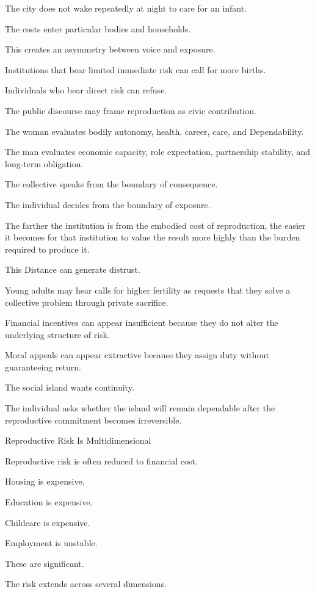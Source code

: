 The city does not wake repeatedly at night to care for an infant.

The costs enter particular bodies and households.

This creates an asymmetry between voice and exposure.

Institutions that bear limited immediate risk can call for more births.

Individuals who bear direct risk can refuse.

The public discourse may frame reproduction as civic contribution.

The woman evaluates bodily autonomy, health, career, care, and Dependability.

The man evaluates economic capacity, role expectation, partnership stability, and long-term obligation.

The collective speaks from the boundary of consequence.

The individual decides from the boundary of exposure.

The farther the institution is from the embodied cost of reproduction, the easier it becomes for that institution to value the result more highly than the burden required to produce it.

This Distance can generate distrust.

Young adults may hear calls for higher fertility as requests that they solve a collective problem through private sacrifice.

Financial incentives can appear insufficient because they do not alter the underlying structure of risk.

Moral appeals can appear extractive because they assign duty without guaranteeing return.

The social island wants continuity.

The individual asks whether the island will remain dependable after the reproductive commitment becomes irreversible.

Reproductive Risk Is Multidimensional

Reproductive risk is often reduced to financial cost.

Housing is expensive.

Education is expensive.

Childcare is expensive.

Employment is unstable.

These are significant.

The risk extends across several dimensions.

